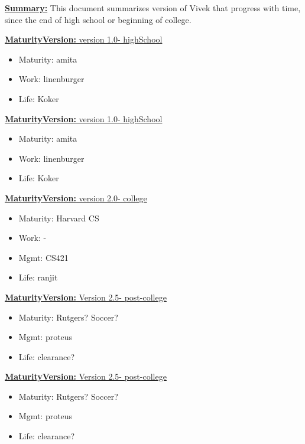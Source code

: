 \documentclass[11pt]{article}
\newcommand{\newMaturityVersion}[1]{\underline{\textbf{MaturityVersion:} #1} }
\begin{document}
\underline{\textbf{Summary:}} This document summarizes version of Vivek that
 progress with time, since the end of high school or beginning of college. 




\newMaturityVersion{version 1.0- highSchool }
\begin{itemize}
\item Maturity: amita 
\item Work: linenburger
\item Life: Koker 
\end{itemize}  

\newMaturityVersion{version 1.0- highSchool }
\begin{itemize}
\item Maturity: amita 
\item Work: linenburger
\item Life: Koker 
\end{itemize}  


\newMaturityVersion{version 2.0- college}
\begin{itemize} 
\item Maturity:  Harvard CS
\item Work: - 
\item Mgmt: CS421 
\item Life: ranjit
\end{itemize} 

\newMaturityVersion{Version 2.5- post-college}
\begin{itemize} 
\item Maturity: Rutgers?  Soccer? 
\item Mgmt: proteus 
\item Life: clearance? 
\end{itemize} 


\newMaturityVersion{Version 2.5- post-college}
\begin{itemize} 
\item Maturity: Rutgers?  Soccer? 
\item Mgmt: proteus 
\item Life: clearance? 
\end{itemize} 
\end{document}
